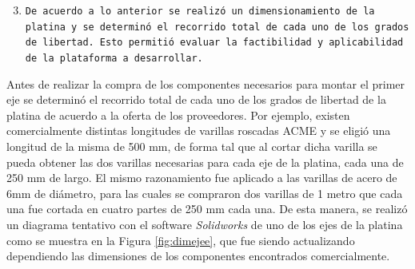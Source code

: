 \begin{enumerate}
  \setcounter{enumi}{2}
  \item \texttt{De acuerdo a lo anterior se realizó un dimensionamiento de la platina y se determinó el recorrido total de cada uno de los grados de libertad. Esto permitió evaluar la factibilidad y aplicabilidad de la plataforma a desarrollar.}
\end{enumerate}

Antes de realizar la compra de los componentes necesarios para montar el primer eje se determinó el recorrido total de cada uno de los grados de libertad de la platina de acuerdo a la oferta de los proveedores. Por ejemplo, existen comercialmente distintas longitudes de varillas roscadas ACME y se eligió una longitud de la misma de 500 mm, de forma tal que al cortar dicha varilla se pueda obtener las dos varillas necesarias para cada eje de la platina, cada una de 250 mm de largo. El mismo razonamiento fue aplicado a las varillas de acero de 6mm de diámetro, para las cuales se compraron dos varillas de 1 metro que cada una fue cortada en cuatro partes de 250 mm cada una. De esta manera, se realizó un diagrama tentativo con el software \textit{Solidworks} de uno de los ejes de la platina como se muestra en la Figura \ref{fig:dimejee}, que fue siendo actualizando dependiendo las dimensiones de los componentes encontrados comercialmente.

